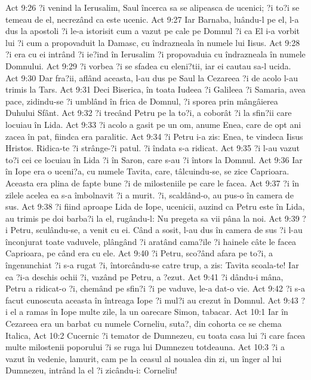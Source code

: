 Act 9:26  ?i venind la Ierusalim, Saul încerca sa se alipeasca de ucenici; ?i to?i se temeau de el, necrezând ca este ucenic.
Act 9:27  Iar Barnaba, luându-l pe el, l-a dus la apostoli ?i le-a istorisit cum a vazut pe cale pe Domnul ?i ca El i-a vorbit lui ?i cum a propovaduit la Damasc, cu îndrazneala în numele lui Iisus.
Act 9:28  ?i era cu ei intrând ?i ie?ind în Ierusalim ?i propovaduia cu îndrazneala în numele Domnului.
Act 9:29  ?i vorbea ?i se sfadea cu eleni?tii, iar ei cautau sa-l ucida.
Act 9:30  Dar fra?ii, aflând aceasta, l-au dus pe Saul la Cezareea ?i de acolo l-au trimis la Tars.
Act 9:31  Deci Biserica, în toata Iudeea ?i Galileea ?i Samaria, avea pace, zidindu-se ?i umblând în frica de Domnul, ?i sporea prin mângâierea Duhului Sfânt.
Act 9:32  ?i trecând Petru pe la to?i, a coborât ?i la sfin?ii care locuiau în Lida.
Act 9:33  ?i acolo a gasit pe un om, anume Enea, care de opt ani zacea în pat, fiindca era paralitic.
Act 9:34  ?i Petru i-a zis: Enea, te vindeca Iisus Hristos. Ridica-te ?i strânge-?i patul. ?i îndata s-a ridicat.
Act 9:35  ?i l-au vazut to?i cei ce locuiau în Lida ?i în Saron, care s-au ?i întors la Domnul.
Act 9:36  Iar în Iope era o uceni?a, cu numele Tavita, care, tâlcuindu-se, se zice Caprioara. Aceasta era plina de fapte bune ?i de milosteniile pe care le facea.
Act 9:37  ?i în zilele acelea ea s-a îmbolnavit ?i a murit. ?i, scaldând-o, au pus-o în camera de sus.
Act 9:38  ?i fiind aproape Lida de Iope, ucenicii, auzind ca Petru este în Lida, au trimis pe doi barba?i la el, rugându-l: Nu pregeta sa vii pâna la noi.
Act 9:39  ?i Petru, sculându-se, a venit cu ei. Când a sosit, l-au dus în camera de sus ?i l-au înconjurat toate vaduvele, plângând ?i aratând cama?ile ?i hainele câte le facea Caprioara, pe când era cu ele.
Act 9:40  ?i Petru, sco?ând afara pe to?i, a îngenunchiat ?i s-a rugat ?i, întorcându-se catre trup, a zis: Tavita scoala-te! Iar ea ?i-a deschis ochii ?i, vazând pe Petru, a ?ezut.
Act 9:41  ?i dându-i mâna, Petru a ridicat-o ?i, chemând pe sfin?i ?i pe vaduve, le-a dat-o vie.
Act 9:42  ?i s-a facut cunoscuta aceasta în întreaga Iope ?i mul?i au crezut în Domnul.
Act 9:43  ?i el a ramas în Iope multe zile, la un oarecare Simon, tabacar.
Act 10:1  Iar în Cezareea era un barbat cu numele Corneliu, suta?, din cohorta ce se chema Italica,
Act 10:2  Cucernic ?i temator de Dumnezeu, cu toata casa lui ?i care facea multe milostenii poporului ?i se ruga lui Dumnezeu totdeauna.
Act 10:3  ?i a vazut în vedenie, lamurit, cam pe la ceasul al noualea din zi, un înger al lui Dumnezeu, intrând la el ?i zicându-i: Corneliu!
